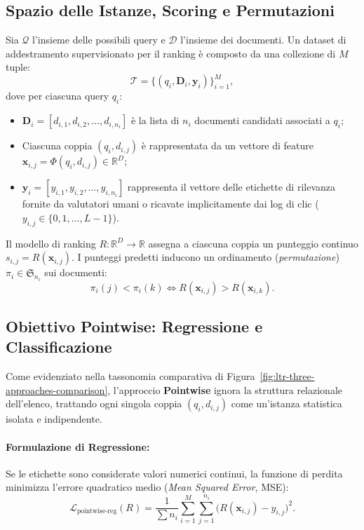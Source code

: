 \FloatBarrier
\subsection{Spazio delle Istanze, Scoring e Permutazioni}
\label{subsec:spazio-istanze-permutazioni}
Sia $\mathcal{Q}$ l'insieme delle possibili query e $\mathcal{D}$ l'insieme dei documenti. Un dataset di addestramento supervisionato per il ranking \`e composto da una collezione di $M$ tuple:
\begin{equation}
\mathcal{T} = \big\{ (q_i, \mathbf{D}_i, \mathbf{y}_i) \big\}_{i=1}^M,
\end{equation}
dove per ciascuna query $q_i$:
\begin{itemize}
    \item $\mathbf{D}_i = [d_{i,1}, d_{i,2}, \dots, d_{i,n_i}]$ \`e la lista di $n_i$ documenti candidati associati a $q_i$;
    \item Ciascuna coppia $(q_i, d_{i,j})$ \`e rappresentata da un vettore di feature $\mathbf{x}_{i,j} = \Phi(q_i, d_{i,j}) \in \mathbb{R}^D$;
    \item $\mathbf{y}_i = [y_{i,1}, y_{i,2}, \dots, y_{i,n_i}]$ rappresenta il vettore delle etichette di rilevanza fornite da valutatori umani o ricavate implicitamente dai log di clic ($y_{i,j} \in \{0, 1, \dots, L-1\}$).
\end{itemize}

Il modello di ranking $R: \mathbb{R}^D \to \mathbb{R}$ assegna a ciascuna coppia un punteggio continuo $s_{i,j} = R(\mathbf{x}_{i,j})$. I punteggi predetti inducono un ordinamento (\textit{permutazione}) $\pi_i \in \mathfrak{S}_{n_i}$ sui documenti:
\begin{equation}
\pi_i(j) < \pi_i(k) \iff R(\mathbf{x}_{i,j}) > R(\mathbf{x}_{i,k}).
\end{equation}

\FloatBarrier
\subsection{Obiettivo Pointwise: Regressione e Classificazione}
\label{subsec:obiettivo-pointwise}
Come evidenziato nella tassonomia comparativa di Figura~\ref{fig:ltr-three-approaches-comparison}, l'approccio \textbf{Pointwise} ignora la struttura relazionale dell'elenco, trattando ogni singola coppia $(q_i, d_{i,j})$ come un'istanza statistica isolata e indipendente.

\paragraph{Formulazione di Regressione:}
Se le etichette sono considerate valori numerici continui, la funzione di perdita minimizza l'errore quadratico medio (\textit{Mean Squared Error}, MSE):
\begin{equation}
\mathcal{L}_{\text{pointwise-reg}}(R) = \frac{1}{\sum n_i} \sum_{i=1}^M \sum_{j=1}^{n_i} \big( R(\mathbf{x}_{i,j}) - y_{i,j} \big)^2.
\end{equation}

